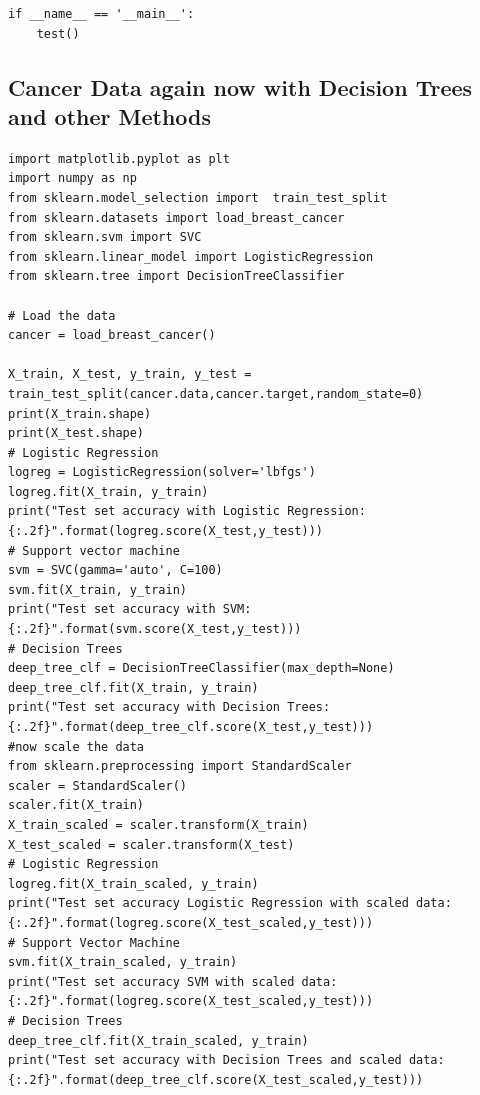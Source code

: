 \documentclass[%
oneside,                 %
final,                   %
10pt]{article}
\begin{document}
\begin{verbatim}
if __name__ == '__main__':
	test()
\end{verbatim}

\subsection*{Cancer Data again now with Decision Trees and other Methods}
\begin{verbatim}
import matplotlib.pyplot as plt
import numpy as np
from sklearn.model_selection import  train_test_split 
from sklearn.datasets import load_breast_cancer
from sklearn.svm import SVC
from sklearn.linear_model import LogisticRegression
from sklearn.tree import DecisionTreeClassifier

# Load the data
cancer = load_breast_cancer()

X_train, X_test, y_train, y_test = train_test_split(cancer.data,cancer.target,random_state=0)
print(X_train.shape)
print(X_test.shape)
# Logistic Regression
logreg = LogisticRegression(solver='lbfgs')
logreg.fit(X_train, y_train)
print("Test set accuracy with Logistic Regression: {:.2f}".format(logreg.score(X_test,y_test)))
# Support vector machine
svm = SVC(gamma='auto', C=100)
svm.fit(X_train, y_train)
print("Test set accuracy with SVM: {:.2f}".format(svm.score(X_test,y_test)))
# Decision Trees
deep_tree_clf = DecisionTreeClassifier(max_depth=None)
deep_tree_clf.fit(X_train, y_train)
print("Test set accuracy with Decision Trees: {:.2f}".format(deep_tree_clf.score(X_test,y_test)))
#now scale the data
from sklearn.preprocessing import StandardScaler
scaler = StandardScaler()
scaler.fit(X_train)
X_train_scaled = scaler.transform(X_train)
X_test_scaled = scaler.transform(X_test)
# Logistic Regression
logreg.fit(X_train_scaled, y_train)
print("Test set accuracy Logistic Regression with scaled data: {:.2f}".format(logreg.score(X_test_scaled,y_test)))
# Support Vector Machine
svm.fit(X_train_scaled, y_train)
print("Test set accuracy SVM with scaled data: {:.2f}".format(logreg.score(X_test_scaled,y_test)))
# Decision Trees
deep_tree_clf.fit(X_train_scaled, y_train)
print("Test set accuracy with Decision Trees and scaled data: {:.2f}".format(deep_tree_clf.score(X_test_scaled,y_test)))

\end{verbatim}


\end{document}
